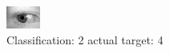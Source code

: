 \begin{figure}[h!]
\begin{center}
\includegraphics[width=0.60\columnwidth]{figures/ID692_class_2_target_4.png}
\end{center}
\caption{ Classification: 2 actual target: 4}
\label{fig:ID692_class_2_target_4}
\end{figure}
